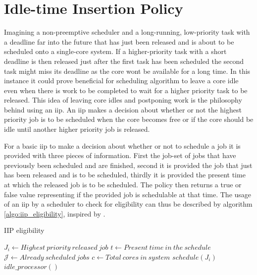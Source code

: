 \documentclass{kththesis}
\begin{document}
\section{Idle-time Insertion Policy} \label{sec:iip}


Imagining a non-preemptive scheduler and a long-running, low-priority task with a deadline far into
the future that has just been released and is about to be scheduled onto a single-core system. If a
higher-priority task with a short deadline is then released just after the first task has been
scheduled the second task might miss its deadline as the core wont be available for a long time. In
this instance it could prove beneficial for scheduling algorithm to leave a core idle even when
there is work to be completed to wait for a higher priority task to be released. This idea of
leaving core idles and postponing work is the philosophy behind using an \acrfull{iip}. An
\acrshort{iip} makes a decision about whether or not the highest priority job is to be scheduled
when the core becomes free or if the core should be idle until another higher priority job is
released.

For a basic \acrshort{iip} to make a decision about whether or not to schedule a job it is provided
with three pieces of information. First the job-set of jobs that have previously been scheduled and
are finished, second it is provided the job that just has been released and is to be scheduled,
thirdly it is provided the present time at which the released job is to be scheduled. The policy
then returns a true or false value representing if the provided job is schedulable at that time. The
usage of an \acrshort{iip} by a scheduler to check for eligibility can thus be described by
algorithm \ref{algo:iip_eligibility}, inspired by \parencite{nasri_exact_2017}.

\begin{algorithm}
    \caption{IIP eligibility}
    \label{algo:iip_eligibility}
    \begin{algorithmic}[1]
        \State $J_i\gets Highest\ priority\ released\ job$
        \State $t\gets Present\ time\ in\ the\ schedule$
        \State $\mathcal{J}\gets Already\ scheduled\ jobs$
        \State $c\gets Total\ cores\ in\ system$
            \State $schedule(J_i)$
        \Else
            \State $idle\_processor()$
        \EndIf
    \end{algorithmic}
\end{algorithm}
\end{document}
